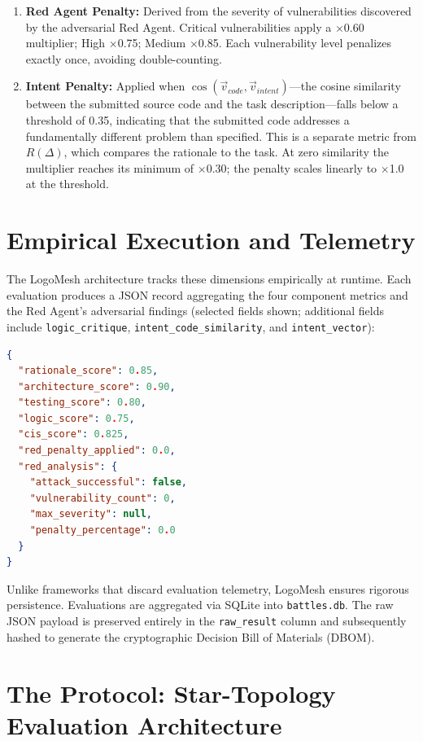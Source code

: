 \documentclass[11pt, a4paper]{article}
\begin{document}
\begin{enumerate}[leftmargin=*]
  \item \textbf{Red Agent Penalty:} Derived from the severity of vulnerabilities discovered by the adversarial Red Agent. Critical vulnerabilities apply a $\times$0.60 multiplier; High $\times$0.75; Medium $\times$0.85. Each vulnerability level penalizes exactly once, avoiding double-counting.
  \item \textbf{Intent Penalty:} Applied when $\cos(\vec{v}_{code}, \vec{v}_{intent})$—the cosine similarity between the submitted source code and the task description—falls below a threshold of 0.35, indicating that the submitted code addresses a fundamentally different problem than specified. This is a separate metric from $R(\Delta)$, which compares the rationale to the task. At zero similarity the multiplier reaches its minimum of $\times$0.30; the penalty scales linearly to $\times$1.0 at the threshold.
\end{enumerate}

\section{Empirical Execution and Telemetry}

The LogoMesh architecture tracks these dimensions empirically at runtime. Each evaluation produces a JSON record aggregating the four component metrics and the Red Agent's adversarial findings (selected fields shown; additional fields include \texttt{logic\_critique}, \texttt{intent\_code\_similarity}, and \texttt{intent\_vector}):

\begin{lstlisting}[language=json]
{
  "rationale_score": 0.85,
  "architecture_score": 0.90,
  "testing_score": 0.80,
  "logic_score": 0.75,
  "cis_score": 0.825,
  "red_penalty_applied": 0.0,
  "red_analysis": {
    "attack_successful": false,
    "vulnerability_count": 0,
    "max_severity": null,
    "penalty_percentage": 0.0
  }
}
\end{lstlisting}

Unlike frameworks that discard evaluation telemetry, LogoMesh ensures rigorous persistence. Evaluations are aggregated via SQLite into \texttt{battles.db}. The raw JSON payload is preserved entirely in the \texttt{raw\_result} column and subsequently hashed to generate the cryptographic Decision Bill of Materials (DBOM).

\section{The Protocol: Star-Topology Evaluation Architecture}
\end{document}
